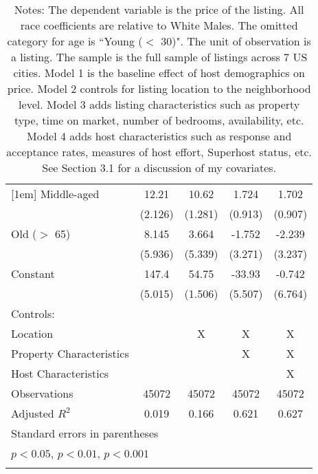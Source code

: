 {\begin{longtable}{l*{4}{c}}
[1em]
Middle-aged         &       12.21\sym{***}&       10.62\sym{***}&       1.724         &       1.702         \\
                    &     (2.126)         &     (1.281)         &     (0.913)         &     (0.907)         \\
[1em]
Old ($>$ 65)           &       8.145         &       3.664         &      -1.752         &      -2.239         \\
                    &     (5.936)         &     (5.339)         &     (3.271)         &     (3.237)         \\
[1em]
Constant            &       147.4\sym{***}&       54.75\sym{***}&      -33.93\sym{***}&      -0.742         \\
                    &     (5.015)         &     (1.506)         &     (5.507)         &     (6.764)         \\
\hline
Controls:        \\
\hspace{3mm} Location  &                &       X         &       X         &       X         \\
\hspace{3mm} Property Characteristics  &                &                &       X         &       X         \\
\hspace{3mm} Host Characteristics  &                &                &                &       X         \\
\hline
Observations        &       45072         &       45072         &       45072         &       45072         \\
Adjusted \(R^{2}\)  &       0.019         &       0.166         &       0.621         &       0.627         \\
\hline\hline
\multicolumn{5}{l}{\footnotesize Standard errors in parentheses}\\
\multicolumn{5}{l}{\footnotesize \sym{*} \(p<0.05\), \sym{**} \(p<0.01\), \sym{***} \(p<0.001\)}\\
\caption*{Notes: The dependent variable is the price of the listing. All race coefficients are relative to White Males. The omitted category for age is ``Young ($<$ 30)". The unit of observation is a listing. The sample is the full sample of listings across 7 US cities. Model 1 is the baseline effect of host demographics on price. Model 2 controls for listing location to the neighborhood level. Model 3 adds listing characteristics such as property type, time on market, number of bedrooms, availability, etc. Model 4 adds host characteristics such as response and acceptance rates, measures of host effort, Superhost status, etc. See Section 3.1 for a discussion of my covariates. }
\label{Table 4}


\end{longtable}
}


